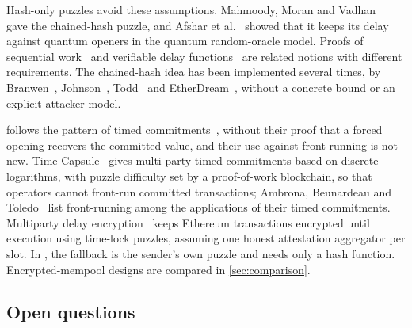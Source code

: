 Hash-only puzzles avoid these assumptions. Mahmoody, Moran and Vadhan~\cite{MMV11} gave the chained-hash puzzle, and Afshar et al.~\cite{ACHLM23} showed that it keeps its delay against quantum openers in the quantum random-oracle model. Proofs of sequential work~\cite{MMV13,CP18} and verifiable delay functions~\cite{BBBF18} are related notions with different requirements. The chained-hash idea has been implemented several times, by Branwen~\cite{Branwen11}, Johnson~\cite{Johnson13}, Todd~\cite{Todd14} and EtherDream~\cite{EtherDream24}, without a concrete bound or an explicit attacker model.

\leanseal follows the pattern of timed commitments~\cite{BN00}, without their proof that a forced opening recovers the committed value, and their use against front-running is not new. Time-Capsule~\cite{DE20} gives multi-party timed commitments based on discrete logarithms, with puzzle difficulty set by a proof-of-work blockchain, so that operators cannot front-run committed transactions; Ambrona, Beunardeau and Toledo~\cite{ABT23} list front-running among the applications of their timed commitments. Multiparty delay encryption~\cite{KAJF23} keeps Ethereum transactions encrypted until execution using time-lock puzzles, assuming one honest attestation aggregator per slot. In \leanseal, the fallback is the sender's own puzzle and needs only a hash function. Encrypted-mempool designs are compared in \cref{sec:comparison}.

\subsection{Open questions}\label{sec:open}

